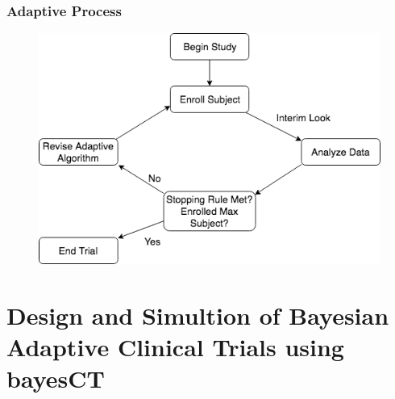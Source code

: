 \documentclass{beamer}
\begin{document}

\begin{frame}
\frametitle{Adaptive Process}
\begin{figure}
\includegraphics[width=0.8\linewidth]{adapttrials.png}
\end{figure}
\end{frame}



\section{Design and Simultion of Bayesian Adaptive Clinical Trials using bayesCT}

\end{document}
